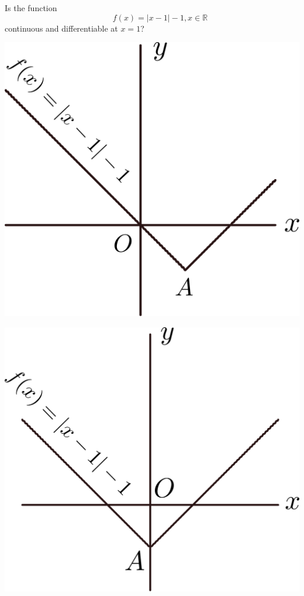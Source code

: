 \documentclass[14pt,fleqn]{extarticle}
\newcommand\fx{ \left\vert x-1\right\vert - 1 }
\begin{document}
Is the function \[\qquad f(x) = \fx, x\in\mathbb{R}\]
continuous and differentiable at $x=1$?

\newcard

\begin{center}
\includegraphics[scale=0.35]{img_right.svg} 
\end{center} 

\newcard

\begin{center}
\includegraphics[scale=0.35]{img_wrong.svg} 
\end{center} 
\end{document}
